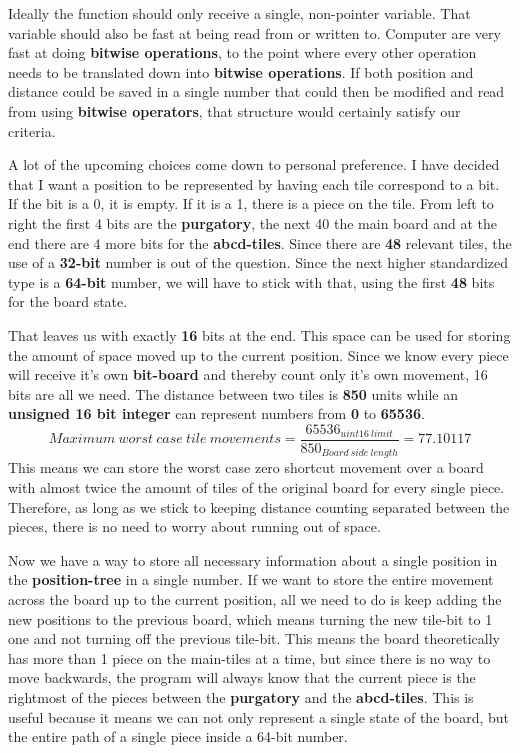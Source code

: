 \documentclass[12pt]{article}
\begin{document}
Ideally the function should only receive a single, non-pointer variable. That variable should also be fast at being read from or written to. 
Computer are very fast at doing \textbf{bitwise operations}, to the point where every other operation needs to be translated down into \textbf{bitwise operations}. If both position and distance could be saved in a single number that could then be modified and read from using \textbf{bitwise operators}, that structure would certainly satisfy our criteria.

A lot of the upcoming choices come down to personal preference. I have decided that I want a position to be represented by having each tile correspond to a bit. If the bit is a 0, it is empty. If it is a 1, there is a piece on the tile. From left to right the first 4 bits are the \textbf{purgatory}, the next 40 the main board and at the end there are 4 more bits for the \textbf{abcd-tiles}.
Since there are \textbf{48} relevant tiles, the use of a \textbf{32-bit} number is out of the question. Since the next higher standardized type is a \textbf{64-bit} number, we will have to stick with that, using the first \textbf{48} bits for the board state.

That leaves us with exactly \textbf{16} bits at the end. This space can be used for storing the amount of space moved up to the current position. Since we know every piece will receive it's own \textbf{bit-board} and thereby count only it's own movement, 16 bits are all we need. The distance between two tiles is \textbf{850} units while an \textbf{unsigned 16 bit integer} can represent numbers from \textbf{0} to \textbf{65536}.
\[
    Maximum~worst~case~tile ~movements = \frac{65536_{uint16~limit}}{850_{Board~side~length}} = 77.10117
\]
This means we can store the worst case zero shortcut movement over a board with almost twice the amount of tiles of the original board for every single piece. Therefore, as long as we stick to keeping distance counting separated between the pieces, there is no need to worry about running out of space.

Now we have a way to store all necessary information about a single position in the \textbf{position-tree} in a single number. If we want to store the entire movement across the board up to the current position, all we need to do is keep adding the new positions to the previous board, which means turning the new tile-bit to 1 one and not turning off the previous tile-bit. This means the board theoretically has more than 1 piece on the main-tiles at a time, but since there is no way to move backwards, the program will always know that the current piece is the rightmost of the pieces between the \textbf{purgatory} and the \textbf{abcd-tiles}. This is useful because it means we can not only represent a single state of the board, but the entire path of a single piece inside a 64-bit number.
\end{document}
